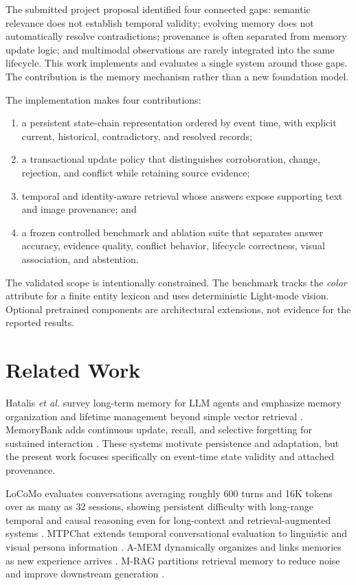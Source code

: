\documentclass[conference]{IEEEtran}
\begin{document}
The submitted project proposal identified four connected gaps: semantic relevance does not establish temporal validity; evolving memory does not automatically resolve contradictions; provenance is often separated from memory update logic; and multimodal observations are rarely integrated into the same lifecycle. This work implements and evaluates a single system around those gaps. The contribution is the memory mechanism rather than a new foundation model.

The implementation makes four contributions:
\begin{enumerate}
    \item a persistent state-chain representation ordered by event time, with explicit current, historical, contradictory, and resolved records;
    \item a transactional update policy that distinguishes corroboration, change, rejection, and conflict while retaining source evidence;
    \item temporal and identity-aware retrieval whose answers expose supporting text and image provenance; and
    \item a frozen controlled benchmark and ablation suite that separates answer accuracy, evidence quality, conflict behavior, lifecycle correctness, visual association, and abstention.
\end{enumerate}

The validated scope is intentionally constrained. The benchmark tracks the \emph{color} attribute for a finite entity lexicon and uses deterministic Light-mode vision. Optional pretrained components are architectural extensions, not evidence for the reported results.

\section{Related Work}
Hatalis \emph{et al.} survey long-term memory for LLM agents and emphasize memory organization and lifetime management beyond simple vector retrieval \cite{hatalis2024}. MemoryBank adds continuous update, recall, and selective forgetting for sustained interaction \cite{zhong2024}. These systems motivate persistence and adaptation, but the present work focuses specifically on event-time state validity and attached provenance.

LoCoMo evaluates conversations averaging roughly 600 turns and 16K tokens over as many as 32 sessions, showing persistent difficulty with long-range temporal and causal reasoning even for long-context and retrieval-augmented systems \cite{maharana2024}. MTPChat extends temporal conversational evaluation to linguistic and visual persona information \cite{yang2025}. A-MEM dynamically organizes and links memories as new experience arrives \cite{xu2025}. M-RAG partitions retrieval memory to reduce noise and improve downstream generation \cite{wang2024}.
\end{document}
